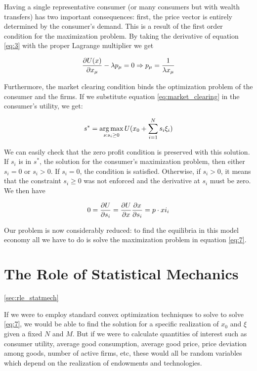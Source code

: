 Having a single representative consumer (or
many consumers but with wealth transfers) has two important
consequences: first, the price vector is entirely determined by the
consumer's demand. This is a result of the first order condition for
the maximization problem. By taking the derivative of equation
\eqref{eq:3} with the proper Lagrange multiplier we get

\begin{equation}
  \label{eq:8}
  \frac{\partial U(x)}{\partial x_\mu} - \lambda p_\mu = 0 \Rightarrow p_\mu =
  \frac{1}{\lambda x_\mu}
\end{equation}

Furthermore, the market clearing condition binds the optimization
problem of the consumer and the firms. If we substitute equation
\eqref{eq:market_clearing} in the consumer's utility, we get:

\begin{equation}
  \label{eq:7}
  s^\ast = \operatorname*{arg\,max}_{s : s_i \geq 0} U(x_0 + \sum_{i=1}^N s_i \xi_i)
\end{equation}

We can easily check that the zero profit condition is preserved with
this solution. If $s_i$ is in $s^\ast$, the solution for the
consumer's maximization problem, then either $s_i = 0$ or $s_i >
0$. If $s_i = 0$, the condition is satisfied. Otherwise, if $s_i > 0$,
it means that the constraint $s_i \geq 0$ was not enforced and the
derivative at $s_i$ must be zero. We then have

\begin{equation}
  \label{eq:9}
  0 = \frac{\partial U}{\partial s_i} = \frac{\partial U}{\partial x} \frac{\partial
    x}{\partial s_i} = p\cdot xi_i
\end{equation}

Our problem is now considerably reduced: to find the equilibria in
this model economy all we have to do is solve the maximization problem
in equation \eqref{eq:7}.


\section{The Role of Statistical Mechanics} \ref{sec:rle_statmech}

If we were to employ standard convex optimization techniques to solve
to solve \eqref{eq:7}, we would be able to find the solution for a
specific realization of $x_0$ and $\xi$ given a fixed $N$ and $M$. But
if we were to calculate quantities of interest such as consumer
utility, average good consumption, average good price, price deviation
among goods, number of active firms, etc, these would all be random
variables which depend on the realization of endowments and
technologies.

